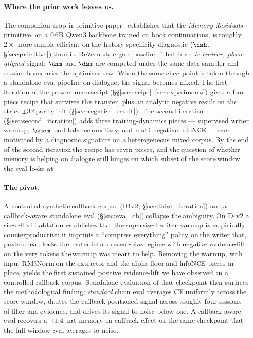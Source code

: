 \paragraph{Where the prior work leaves us.} The companion drop-in
primitive paper~\cite{liu2025drop} establishes that the
\emph{Memory Residuals} primitive, on a $0.6$B Qwen3 backbone
trained on book continuations, is roughly $2\!\times$ more
sample-efficient on the history-specificity diagnostic ($\dsh$,
\S\ref{sec:primitive}) than its ReZero-style gate baseline. That
is an \emph{in-trainer, phase-aligned} signal: $\dnm$ and $\dsh$
are computed under the same data sampler and session boundaries
the optimiser saw. When the same checkpoint is taken through a
standalone eval pipeline on dialogue, the signal becomes mixed.
The first iteration of the present manuscript
(\S\S\ref{sec:recipe}--\ref{sec:experiments}) gives a four-piece
recipe that survives this transfer, plus an analytic negative
result on the strict $\pm 32$ parity init
(\S\ref{sec:negative_result}). The second iteration
(\S\ref{sec:second_iteration}) adds three training-dynamics pieces
--- supervised writer warmup, $\amem$ load-balance auxiliary, and
multi-negative InfoNCE --- each motivated by a diagnostic signature
on a heterogeneous mixed corpus. By the end of the second iteration
the recipe has seven pieces, and the question of whether memory is
helping on dialogue still hinges on which subset of the score
window the eval looks at.

\paragraph{The pivot.} A controlled synthetic callback corpus
(D4v2, \S\ref{sec:third_iteration}) and a callback-aware standalone
eval (\S\ref{sec:eval_cb}) collapse the ambiguity. On D4v2 a
six-cell v14 ablation establishes that the supervised writer
warmup is empirically counterproductive: it imprints a
``compress everything'' policy on the writer that, post-anneal,
locks the router into a recent-bias regime with negative
evidence-lift on the very tokens the warmup was meant to help.
Removing the warmup, with input-RMSNorm on the extractor and the
alpha-floor and InfoNCE pieces in place, yields the first sustained
positive evidence-lift we have observed on a controlled callback
corpus. Standalone evaluation of that checkpoint then surfaces the
methodological finding: \emph{standard} chain eval averages CE
uniformly across the score window, dilutes the callback-positioned
signal across roughly four sessions of filler-and-evidence, and
drives its signal-to-noise below one. A callback-aware eval
recovers a $+1.4$~nat memory-on-callback effect on the same
checkpoint that the full-window eval averages to noise.

